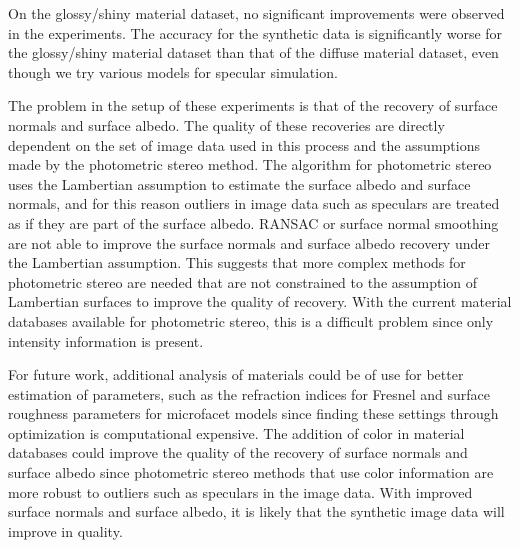 On the glossy/shiny material dataset, no significant improvements were observed in the experiments. The accuracy for the synthetic data is significantly worse for the glossy/shiny material dataset than that of the diffuse material dataset, even though we try various models for specular simulation.

The problem in the setup of these experiments is that of the recovery of surface normals and surface albedo. The quality of these recoveries are directly dependent on the set of image data used in this process and the assumptions made by the photometric stereo method. The algorithm for photometric stereo uses the Lambertian assumption to estimate the surface albedo and surface normals, and for this reason outliers in image data such as speculars are treated as if they are part of the surface albedo. RANSAC or surface normal smoothing are not able to improve the surface normals and surface albedo recovery under the Lambertian assumption. This suggests that more complex methods for photometric stereo are needed that are not constrained to the assumption of Lambertian surfaces to improve the quality of recovery. With the current material databases available for photometric stereo, this is a difficult problem since only intensity information is present. 

For future work, additional analysis of materials could be of use for better estimation of parameters, such as the refraction indices for Fresnel and surface roughness parameters for microfacet models since finding these settings through optimization is computational expensive. The addition of color in material databases could improve the quality of the recovery of surface normals and surface albedo since photometric stereo methods that use color information are more robust to outliers such as speculars in the image data. With improved surface normals and surface albedo, it is likely that the synthetic image data will improve in quality.
